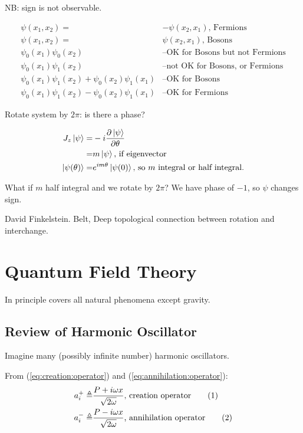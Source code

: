 \documentclass[]{article}
\newcommand\numberthis{\addtocounter{equation}{1}\tag{\theequation}}
\begin{document}
NB: sign is not observable.

\begin{align*}
\psi(x_1,x_2)=&-\psi(x_2,x_1) \text{, Fermions}\\
\psi(x_1,x_2)=&\psi(x_2,x_1) \text{, Bosons}\\
\psi_0(x_1)\psi_0(x_2)& \text{--OK for Bosons but not Fermions}\\
\psi_0(x_1)\psi_1(x_2)& \text{--not OK for Bosons, or Fermions}\\
\psi_0(x_1)\psi_1(x_2)+\psi_0(x_2)\psi_1(x_1)& \text{--OK for Bosons}\\
\psi_0(x_1)\psi_1(x_2)-\psi_0(x_2)\psi_1(x_1)& \text{--OK for Fermions}
\end{align*}

Rotate system by $2\pi$: is there a phase?

\begin{align*}
J_z\ket{\psi} =& -i \frac{\partial \ket{\psi}}{\partial \theta}\\
=& m\ket{\psi} \text{, if eigenvector}\\
\ket{\psi(\theta)} =& e^{im\theta}\ket{\psi(0)}\text{, so $m$ integral or half integral.}
\end{align*}

What if $m$ half integral and we rotate by $2\pi$? We have phase of $-1$, so $\psi$ changes sign.

David Finkelstein. Belt, Deep topological connection between rotation and interchange.

\section{Quantum Field Theory}

In principle covers all natural phenomena except gravity.

\subsection{Review of Harmonic Oscillator}
Imagine many (possibly infinite number) harmonic oscillators.

From (\ref{eq:creation:operator}) and (\ref{eq:annihilation:operator}):
\begin{align*}
a^+_i \triangleq & \frac{P + i \omega x } {\sqrt{2 \omega}} \text{, creation operator} \numberthis \label{eq:creation:operator:i}\\
a^-_i \triangleq & \frac{P - i \omega x } {\sqrt{2 \omega}}\text{, annihilation operator} \numberthis \label{eq:annihilation:operator_i}\\
\end{align*}
\end{document}
